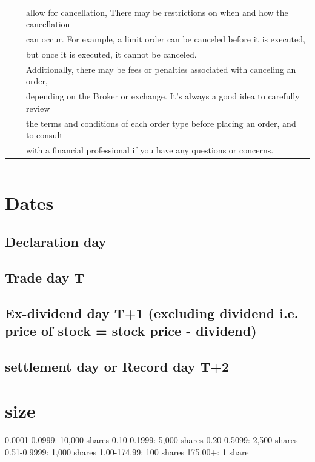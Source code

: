 \documentclass[11pt]{article}
\begin{document}
\begin{center}
\begin{tabular}{lll}
 &  & allow for cancellation, There may be restrictions on when and how the cancellation\\[0pt]
 &  & can occur. For example, a limit order can be canceled before it is executed,\\[0pt]
 &  & but once it is executed, it cannot be canceled.\\[0pt]
 &  & Additionally, there may be fees or penalties associated with canceling an order,\\[0pt]
 &  & depending on the Broker or exchange. It's always a good idea to carefully review\\[0pt]
 &  & the terms and conditions of each order type before placing an order, and to consult\\[0pt]
 &  & with a financial professional if you have any questions or concerns.\\[0pt]
\hline
\end{tabular}
\end{center}


\begin{center}
\begin{tabular}{}
\hline
\end{tabular}
\end{center}
\section{Dates}
\label{sec:org108f6bd}
\subsection{Declaration day}
\label{sec:org6d7c971}
\subsection{Trade day                            T}
\label{sec:org0df7f94}
\subsection{Ex-dividend day                      T+1        (excluding dividend i.e. price of stock = stock price - dividend)}
\label{sec:orgd154c26}
\subsection{settlement day or Record day         T+2}
\label{sec:org5b85161}

\section{size}
\label{sec:org2b2e2a8}
0.0001-0.0999: 10,000 shares
0.10-0.1999: 5,000 shares
0.20-0.5099: 2,500 shares
0.51-0.9999: 1,000 shares
1.00-174.99: 100 shares
175.00+: 1 share
\end{document}
